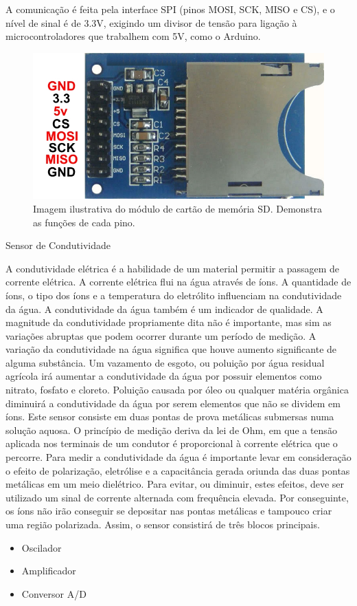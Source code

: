 A comunicação é feita pela interface SPI (pinos MOSI, SCK, MISO e CS), e o nível de sinal é de 3.3V, exigindo um divisor de tensão para ligação à microcontroladores que trabalhem com 5V, como o Arduino.

 \begin{figure} [!htp]
	\centering
	\includegraphics[scale=0.6]{figuras/cartaosdpinagem}
	\caption{Imagem ilustrativa do módulo de cartão de memória SD. Demonstra as funções de cada pino.}
	\label{cartaosdpinagem}
\end{figure}

Sensor de Condutividade

A condutividade elétrica é a habilidade de um material permitir a passagem de corrente elétrica. A corrente elétrica flui na água através de íons. A quantidade de íons, o tipo dos íons e a temperatura do eletrólito influenciam na condutividade da água.
A condutividade da água também é um indicador de qualidade. A magnitude da condutividade propriamente dita não é importante, mas sim as variações abruptas que podem ocorrer durante um período de medição. A variação da condutividade na água significa que houve aumento significante de alguma substância. Um vazamento de esgoto, ou poluição por água residual agrícola irá aumentar a condutividade da água por possuir elementos como nitrato, fosfato e cloreto. Poluição causada por óleo ou qualquer matéria orgânica diminuirá a condutividade da água por serem elementos que não se dividem em íons.
Este sensor consiste em duas pontas de prova metálicas submersas numa solução aquosa. O princípio de medição deriva da lei de Ohm, em que a tensão aplicada nos terminais de um condutor é proporcional à corrente elétrica que o percorre. Para medir a condutividade da água é importante levar em consideração o efeito de polarização, eletrólise e a capacitância gerada oriunda das duas pontas metálicas em um meio dielétrico. Para evitar, ou diminuir, estes efeitos, deve ser utilizado um sinal de corrente alternada com frequência elevada. Por conseguinte, os íons não irão conseguir se depositar nas pontas metálicas e tampouco criar uma região polarizada. Assim, o sensor consistirá de três blocos principais.
\begin{itemize}
	\item Oscilador
	\item Amplificador
	\item Conversor A/D
\end{itemize}

